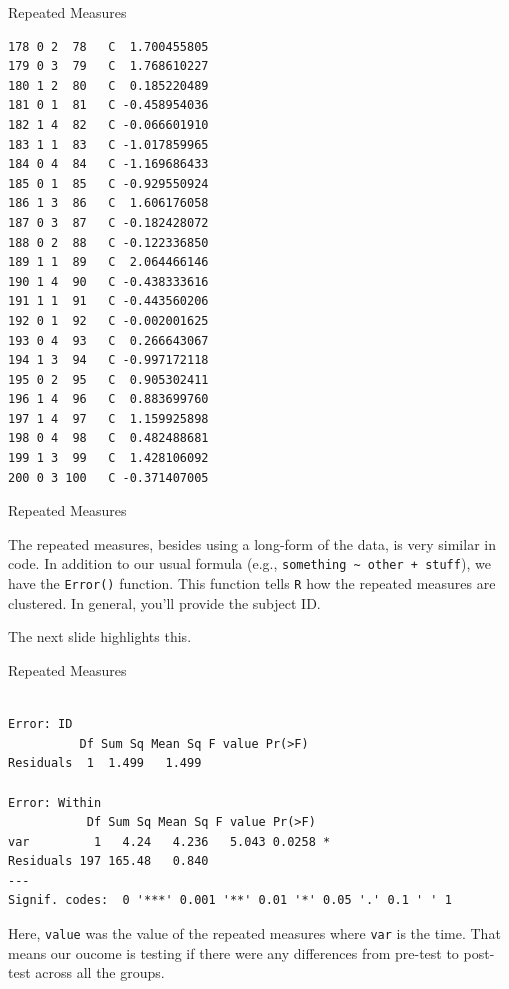 \begin{frame}[fragile]{Repeated Measures}
\begin{verbatim}
178 0 2  78   C  1.700455805
179 0 3  79   C  1.768610227
180 1 2  80   C  0.185220489
181 0 1  81   C -0.458954036
182 1 4  82   C -0.066601910
183 1 1  83   C -1.017859965
184 0 4  84   C -1.169686433
185 0 1  85   C -0.929550924
186 1 3  86   C  1.606176058
187 0 3  87   C -0.182428072
188 0 2  88   C -0.122336850
189 1 1  89   C  2.064466146
190 1 4  90   C -0.438333616
191 1 1  91   C -0.443560206
192 0 1  92   C -0.002001625
193 0 4  93   C  0.266643067
194 1 3  94   C -0.997172118
195 0 2  95   C  0.905302411
196 1 4  96   C  0.883699760
197 1 4  97   C  1.159925898
198 0 4  98   C  0.482488681
199 1 3  99   C  1.428106092
200 0 3 100   C -0.371407005
\end{verbatim}

\end{frame}

\begin{frame}[fragile]{Repeated Measures}

\Large
The repeated measures, besides using a long-form of the data, is very
similar in code. In addition to our usual formula (e.g.,
\texttt{something\ \textasciitilde{}\ other\ +\ stuff}), we have the
\texttt{Error()} function. This function tells \texttt{R} how the
repeated measures are clustered. In general, you'll provide the subject
ID.

The next slide highlights this.

\end{frame}

\begin{frame}[fragile]{Repeated Measures}

\small

\begin{Shaded}
\begin{Highlighting}[]
\StringTok{ }\OperatorTok{~}\StringTok{ }\OperatorTok{+}\StringTok{ }
\end{Highlighting}
\end{Shaded}

\begin{verbatim}

Error: ID
          Df Sum Sq Mean Sq F value Pr(>F)
Residuals  1  1.499   1.499               

Error: Within
           Df Sum Sq Mean Sq F value Pr(>F)  
var         1   4.24   4.236   5.043 0.0258 *
Residuals 197 165.48   0.840                 
---
Signif. codes:  0 '***' 0.001 '**' 0.01 '*' 0.05 '.' 0.1 ' ' 1
\end{verbatim}

\normalsize
Here, \texttt{value} was the value of the repeated measures where
\texttt{var} is the time. That means our oucome is testing if there were
any differences from pre-test to post-test across all the groups.

\end{frame}

